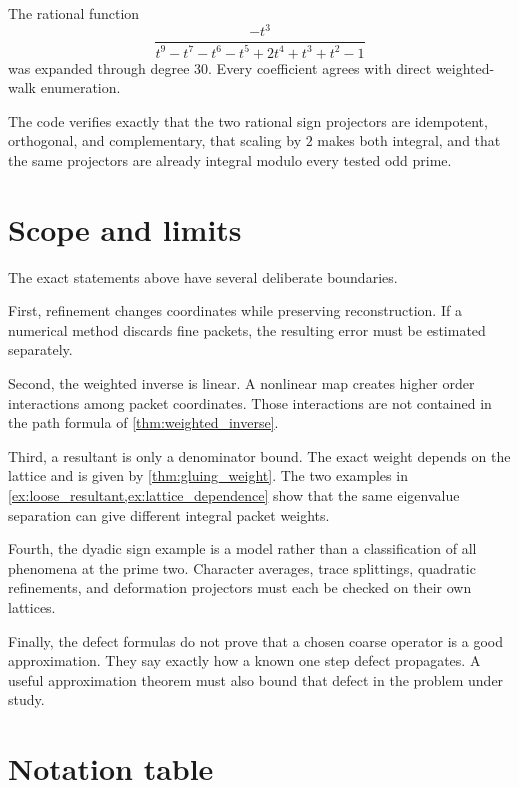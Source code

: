 \begin{certificate}
The rational function
\[
\frac{-t^3}{t^9-t^7-t^6-t^5+2t^4+t^3+t^2-1}
\]
was expanded through degree $30$. Every coefficient agrees with direct weighted-walk enumeration.
\end{certificate}

\begin{certificate}
The code verifies exactly that the two rational sign projectors are idempotent, orthogonal, and complementary, that scaling by $2$ makes both integral, and that the same projectors are already integral modulo every tested odd prime.
\end{certificate}


\section{Scope and limits}\label{sec:limits}

The exact statements above have several deliberate boundaries.

First, refinement changes coordinates while preserving reconstruction. If a numerical method discards fine packets, the resulting error must be estimated separately.

Second, the weighted inverse is linear.  A nonlinear map creates higher order interactions among packet coordinates.  Those interactions are not contained in the path formula of \cref{thm:weighted_inverse}.

Third, a resultant is only a denominator bound.  The exact weight depends on the lattice and is given by \cref{thm:gluing_weight}.  The two examples in \cref{ex:loose_resultant,ex:lattice_dependence} show that the same eigenvalue separation can give different integral packet weights.

Fourth, the dyadic sign example is a model rather than a classification of all phenomena at the prime two.  Character averages, trace splittings, quadratic refinements, and deformation projectors must each be checked on their own lattices.

Finally, the defect formulas do not prove that a chosen coarse operator is a good approximation.  They say exactly how a known one step defect propagates.  A useful approximation theorem must also bound that defect in the problem under study.



\appendix
\section{Notation table}

